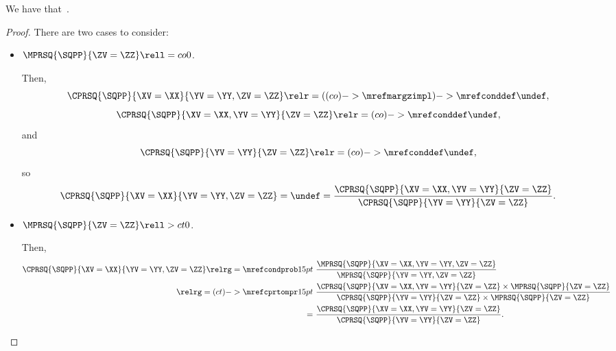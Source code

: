 \begin{proposition}
  We have that\ \sqcpcprobexprprop.%
\end{proposition}

\begin{proof}
  There are two cases to consider:
  \begin{itemize}
    \item $\MPRSQ{\SQPP}{\ZV = \ZZ} \rell = co 0$.

      Then,
      $$\CPRSQ{\SQPP}{\XV = \XX}{\YV = \YY, \ZV = \ZZ} \relr = {((co)->\mrefmargzimpl)->\mrefconddef} \undef,$$
      $$\CPRSQ{\SQPP}{\XV = \XX, \YV = \YY}{\ZV = \ZZ} \relr = {(co)->\mrefconddef} \undef,$$
      and
      $$\CPRSQ{\SQPP}{\YV = \YY}{\ZV = \ZZ} \relr = {(co)->\mrefconddef} \undef,$$
      so
      \begin{align*}
        \CPRSQ{\SQPP}{\XV = \XX}{\YV = \YY, \ZV = \ZZ} 
        = \undef =
        \frac{\CPRSQ{\SQPP}{\XV = \XX, \YV = \YY}{\ZV = \ZZ}}{\CPRSQ{\SQPP}{\YV = \YY}{\ZV = \ZZ}}.
      \end{align*}
    \item $\MPRSQ{\SQPP}{\ZV = \ZZ} \rell > ct 0$.
      
      Then,
      \begin{align*}
        \CPRSQ{\SQPP}{\XV = \XX}{\YV = \YY, \ZV = \ZZ} 
        \relrg = {\mrefcondprob} 15pt \ & 
        \frac{\MPRSQ{\SQPP}{\XV = \XX, \YV = \YY, \ZV = \ZZ}}{\MPRSQ{\SQPP}{\YV = \YY, \ZV = \ZZ}}\\
        \relrg = {(ct)->\mrefcprtompr} 15pt \ &
        \frac{\CPRSQ{\SQPP}{\XV = \XX, \YV = \YY}{\ZV = \ZZ}\times\MPRSQ{\SQPP}{\ZV =\ZZ}}{\CPRSQ{\SQPP}{\YV = \YY}{\ZV = \ZZ}\times\MPRSQ{\SQPP}{\ZV =\ZZ}}\\
        =\ &
        \frac{\CPRSQ{\SQPP}{\XV = \XX, \YV = \YY}{\ZV = \ZZ}}{\CPRSQ{\SQPP}{\YV = \YY}{\ZV = \ZZ}}.
      \end{align*}
  \end{itemize}
\end{proof}
